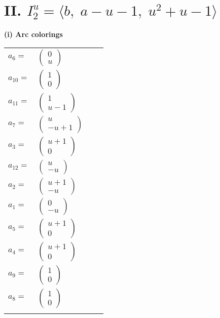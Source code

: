 \documentclass[1p]{elsarticle_modified}
\theoremstyle{definition}
\begin{document}
\centering \section*{II. $I^u_{2}= \langle b,\;a- u-1,\;u^2+u-1 \rangle$}
\flushleft \textbf{(i) Arc colorings}\\
\begin{tabular}{m{7pt} m{180pt} m{7pt} m{180pt} }
\flushright $a_{6}=$&$\begin{pmatrix}0\\u\end{pmatrix}$ \\
\flushright $a_{10}=$&$\begin{pmatrix}1\\0\end{pmatrix}$ \\
\flushright $a_{11}=$&$\begin{pmatrix}1\\u-1\end{pmatrix}$ \\
\flushright $a_{7}=$&$\begin{pmatrix}u\\- u+1\end{pmatrix}$ \\
\flushright $a_{3}=$&$\begin{pmatrix}u+1\\0\end{pmatrix}$ \\
\flushright $a_{12}=$&$\begin{pmatrix}u\\- u\end{pmatrix}$ \\
\flushright $a_{2}=$&$\begin{pmatrix}u+1\\- u\end{pmatrix}$ \\
\flushright $a_{1}=$&$\begin{pmatrix}0\\- u\end{pmatrix}$ \\
\flushright $a_{5}=$&$\begin{pmatrix}u+1\\0\end{pmatrix}$ \\
\flushright $a_{4}=$&$\begin{pmatrix}u+1\\0\end{pmatrix}$ \\
\flushright $a_{9}=$&$\begin{pmatrix}1\\0\end{pmatrix}$ \\
\flushright $a_{8}=$&$\begin{pmatrix}1\\0\end{pmatrix}$\\&\end{tabular}
\end{document}

